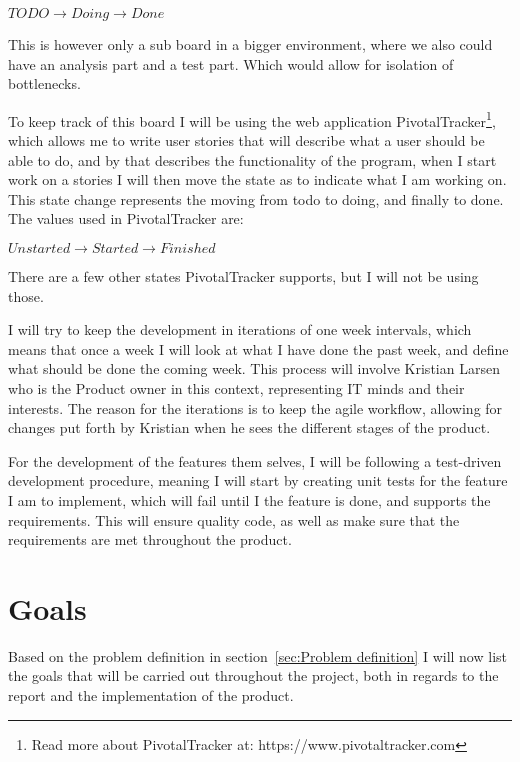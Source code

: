 \begin{center}
  $TODO \rightarrow Doing \rightarrow Done$
\end{center}

This is however only a sub board in a bigger environment, where we also could have an analysis part and a test part. Which would allow for isolation of bottlenecks\cite{kanban}.

To keep track of this board I will be using the web application PivotalTracker\footnote{Read more about PivotalTracker at: https://www.pivotaltracker.com}, which allows me to write user stories that will describe what a user should be able to do, and by that describes the functionality of the program, when I start work on a stories I will then move the state as to indicate what I am working on. This state change represents the moving from todo to doing, and finally to done. The values used in PivotalTracker are:

\begin{center}
  $Unstarted \rightarrow Started \rightarrow Finished$
\end{center}

There are a few other states PivotalTracker supports, but I will not be using those.

I will try to keep the development in iterations of one week intervals, which means that once a week I will look at what I have done the past week, and define what should be done the coming week. This process will involve Kristian Larsen who is the Product owner in this context, representing IT minds and their interests. The reason for the iterations is to keep the agile workflow, allowing for changes put forth by Kristian when he sees the different stages of the product.

For the development of the features them selves, I will be following a test-driven development procedure, meaning I will start by creating unit tests for the feature I am to implement, which will fail until I the feature is done, and supports the requirements. This will ensure quality code, as well as make sure that the requirements are met throughout the product.

\section{Goals}
\label{sec:Goals}
Based on the problem definition in section~\ref{sec:Problem definition} I will now list the goals that will be carried out throughout the project, both in regards to the report and the implementation of the product.

